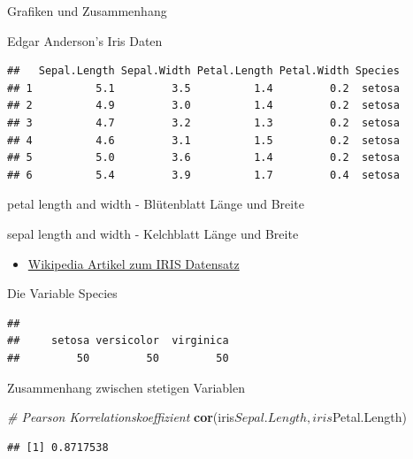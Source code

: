 \documentclass[ignorenonframetext,]{beamer}
\newenvironment{Shaded}{}{}
\newcommand{\KeywordTok}[1]{\textcolor[rgb]{0.00,0.44,0.13}{\textbf{{#1}}}}
\newcommand{\CommentTok}[1]{\textcolor[rgb]{0.38,0.63,0.69}{\textit{{#1}}}}
\newcommand{\NormalTok}[1]{{#1}}
\providecommand{\tightlist}{%
\setlength{\itemsep}{0pt}\setlength{\parskip}{0pt}}
\begin{document}
\begin{frame}[fragile]{Grafiken und Zusammenhang}
\begin{block}{Edgar Anderson's Iris Daten}
\begin{verbatim}
##   Sepal.Length Sepal.Width Petal.Length Petal.Width Species
## 1          5.1         3.5          1.4         0.2  setosa
## 2          4.9         3.0          1.4         0.2  setosa
## 3          4.7         3.2          1.3         0.2  setosa
## 4          4.6         3.1          1.5         0.2  setosa
## 5          5.0         3.6          1.4         0.2  setosa
## 6          5.4         3.9          1.7         0.4  setosa
\end{verbatim}

petal length and width - Blütenblatt Länge und Breite

sepal length and width - Kelchblatt Länge und Breite

\begin{itemize}
\tightlist
\item
  \href{https://en.wikipedia.org/wiki/Iris_flower_data_set}{Wikipedia
  Artikel zum IRIS Datensatz}
\end{itemize}

\end{block}

\begin{block}{Die Variable Species}

\begin{Shaded}
\end{Shaded}

\begin{verbatim}
## 
##     setosa versicolor  virginica 
##         50         50         50
\end{verbatim}

\end{block}

\begin{block}{Zusammenhang zwischen stetigen Variablen}

\begin{Shaded}
\begin{Highlighting}[]
\CommentTok{# Pearson Korrelationskoeffizient}
\KeywordTok{cor}\NormalTok{(iris$Sepal.Length,iris$Petal.Length)}
\end{Highlighting}
\end{Shaded}

\begin{verbatim}
## [1] 0.8717538
\end{verbatim}


\end{block}
\end{frame}
\end{document}
